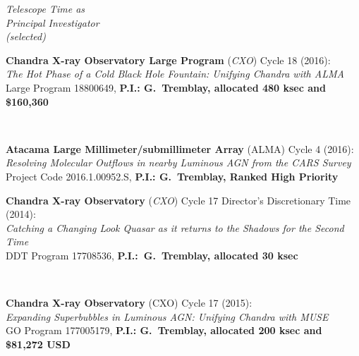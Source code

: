 \documentclass[11pt]{article}
\begin{document}
\vspace{4mm}





\hspace{2.5mm} \parbox{1.5in}{{\it Telescope Time as \\ Principal Investigator \\ (selected) }} \parbox{5.15in}{{\bf Chandra X-ray Observatory Large Program} ({\it CXO}) Cycle 18 (2016):\\ {\it The Hot Phase of a Cold Black Hole Fountain: Unifying Chandra with ALMA} \\ Large Program 18800649, {\bf P.I.: G.~Tremblay, allocated 480 ksec and \$160,360}} \\


\vspace{4mm}


\hspace{42mm} \parbox{5.15in}{{\bf Atacama Large Millimeter/submillimeter Array} (ALMA) Cycle 4 (2016):\\ {\it  Resolving Molecular Outflows in nearby Luminous AGN from the CARS Survey} \\ Project Code 2016.1.00952.S, {\bf P.I.: G.~Tremblay, Ranked High Priority}}

\vspace{4mm}

\hspace{42mm} \parbox{5.15in}{{\bf Chandra X-ray Observatory} ({\it CXO}) Cycle 17 Director's Discretionary Time (2014): \\ {\it Catching a Changing Look Quasar as it returns to the Shadows for the Second Time} \\ DDT Program 17708536, {\bf P.I.:~G.~Tremblay, allocated 30 ksec}}\\


\vspace{4mm}

\hspace{42mm} \parbox{5.15in}{{\bf Chandra X-ray Observatory} (CXO) Cycle 17 (2015): \\ {\it 
Expanding Superbubbles in Luminous AGN: Unifying Chandra with MUSE} \\  GO Program 177005179, {\bf P.I.: G.~Tremblay, allocated 200 ksec and \$81,272 USD}} \\


\vspace{4mm}
\end{document}
